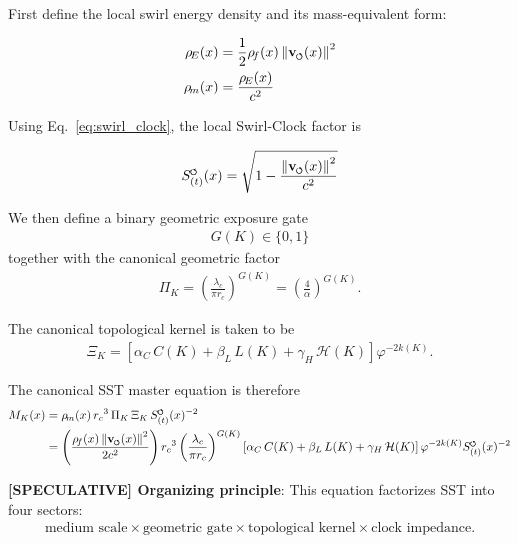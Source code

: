 \documentclass[11pt]{article}
\theoremstyle{definition}
\theoremstyle{plain}
\theoremstyle{remark}
\newcommand{\swirlarrow}{\mathchoice{\mkern-2mu\scriptstyle\boldsymbol{\circlearrowleft}}{\mkern-2mu\scriptstyle\boldsymbol{\circlearrowleft}}{\mkern-2mu\scriptscriptstyle\boldsymbol{\circlearrowleft}}{\mkern-2mu\scriptscriptstyle\boldsymbol{\circlearrowleft}}}
\newcommand{\vswirl}{\mathbf{v}_{\swirlarrow}}
\newcommand{\rhoF}{{\rho_{\!f}}}
\newcommand{\rhoE}{\rho_{\!E}}
\newcommand{\rhoM}{\rho_{\!m}}
\newcommand{\SwirlClock}{{S_{(t)}^{\swirlarrow}}}
\newcommand{\rc}{{r_c}}
\begin{document}
        First define the local swirl energy density and its mass-equivalent form:

        \begin{align}
            \rhoE(x) &= \frac{1}{2}\rhoF(x)\,\norm{\vswirl(x)}^2 \\
            \rhoM(x) &= \frac{\rhoE(x)}{c^2}
        \end{align}

        Using Eq.~\ref{eq:swirl_clock}, the local Swirl-Clock factor is

        \begin{align}
            \SwirlClock(x) = \sqrt{1 - \frac{\norm{\vswirl(x)}^2}{c^2}}
        \end{align}

        We then define a binary geometric exposure gate
        \begin{align}
            G(K) \in \{0,1\}
        \end{align}
        together with the canonical geometric factor
        \begin{align}
            \Pi_K = \left( \frac{\lambda_c}{\pi \rc} \right)^{G(K)} = \left( \frac{4}{\alpha} \right)^{G(K)} .
        \end{align}

        The canonical topological kernel is taken to be
        \begin{align}
            \Xi_K = \left[ \alpha_C\,C(K) + \beta_L\,L(K) + \gamma_H\,\mathcal{H}(K) \right] \varphi^{-2k(K)} .
        \end{align}

        The canonical SST master equation is therefore
        \begin{align}
            M_K(x)
            &= \rhoM(x)\,\rc^3\,\Pi_K\,\Xi_K\,\SwirlClock(x)^{-2} \\
            &= \left( \frac{\rhoF(x)\,\norm{\vswirl(x)}^2}{2c^2} \right)
               \rc^3
               \left( \frac{\lambda_c}{\pi \rc} \right)^{G(K)}
               \left[ \alpha_C\,C(K) + \beta_L\,L(K) + \gamma_H\,\mathcal{H}(K) \right]
               \varphi^{-2k(K)}
               \SwirlClock(x)^{-2}
            \label{eq:sst_master_equation}
        \end{align}

        \textbf{[SPECULATIVE] Organizing principle}: This equation factorizes SST into four sectors:
        \begin{align}
            \text{medium scale} \times \text{geometric gate} \times \text{topological kernel} \times \text{clock impedance} .
        \end{align}
\end{document}
